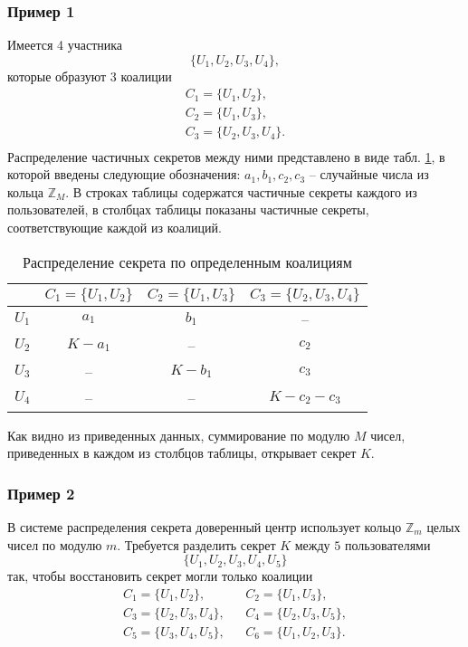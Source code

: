 \documentclass[10pt,a4paper]{book}
\newcommand{\example}{\textsc{\textbf{Пример.}} }
\newcommand{\group}[1]{\mathbb{#1}}
\newcommand{\Z}{\group{Z}}
\begin{document}
\subsubsection{Пример 1}

Имеется 4 участника
    \[ \{ U_1, U_2, U_3, U_4 \}, \]
которые образуют 3 коалиции
\[ \begin{array}{l}
    C_1 = \{ U_1, U_2 \}, \\
    C_2 = \{ U_1, U_3 \}, \\
    C_3 = \{ U_2, U_3, U_4 \}. \\
\end{array} \]
Распределение частичных секретов между ними представлено в виде табл. \ref{tab:secret-share-coalition-1}, в которой введены следующие обозначения: $a_1, b_1, c_2, c_3$ -- случайные числа из кольца $\Z_M$. В строках таблицы содержатся частичные секреты каждого из пользователей, в столбцах таблицы показаны частичные секреты, соответствующие каждой из коалиций.

\begin{table}[!ht]
    \centering
    \caption{Распределение секрета по определенным коалициям\label{tab:secret-share-coalition-1}}
    \begin{tabular}{|c||c|c|c|}
        \hline
              & $C_1 = \{ U_1, U_2 \}$ & $C_2 = \{U_1, U_3 \}$ & $C_3 = \{ U_2, U_3, U_4 \}$ \\
        \hline \hline
        $U_1$ & $a_1$     & $b_1$     & -- \\
        $U_2$ & $K - a_1$ & --        & $c_2$ \\
        $U_3$ & --        & $K - b_1$ & $c_3$  \\
        $U_4$ & --        & --        & $K - c_2 - c_3$ \\
        \hline
    \end{tabular}
\end{table}

Как видно из приведенных данных, суммирование по модулю $M$ чисел, приведенных в каждом из столбцов таблицы, открывает секрет $K$.


\subsubsection{Пример 2}

В системе распределения секрета доверенный
центр использует кольцо $\Z_m$ целых чисел по модулю $m$. Требуется разделить секрет $K$ между $5$ пользователями
    \[ \{ U_1, U_2, U_3, U_4, U_5 \} \]
так, чтобы восстановить секрет могли только коалиции
\[ \begin{array}{lll}
    C_1 = \{ U_1, U_2 \},      & & C_2 = \{ U_1, U_3 \}, \\
    C_3 = \{ U_2, U_3, U_4 \}, & & C_4 = \{ U_2, U_3, U_5 \}, \\
    C_5 = \{ U_3, U_4, U_5 \}, & & C_6 = \{ U_1, U_2, U_3 \}. \\
\end{array} \]
\end{document}
